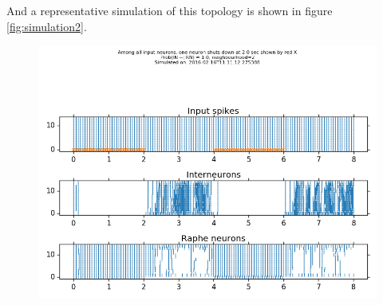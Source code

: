 \documentclass[]{article}
\begin{document}
And a representative simulation of this topology is shown in figure
\ref{fig:simulation2}.

\begin{figure}[ht!]
\begin{center}
    \includegraphics[width=1\textwidth]{./_snapshots/minimal_network.py.png}
\end{center}
\caption{}
\label{fig:}
\end{figure}
\end{document}
